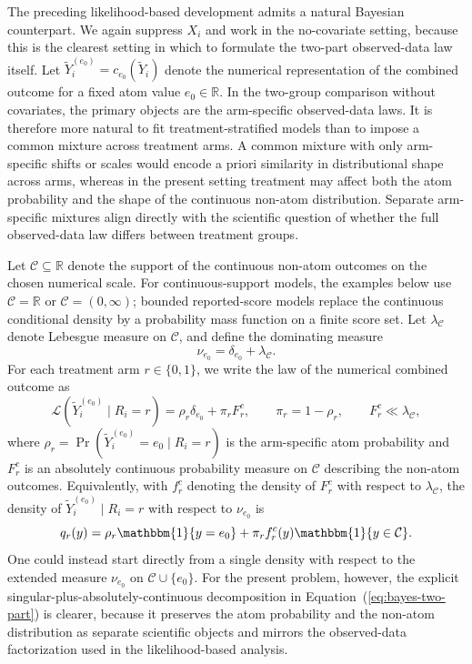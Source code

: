 \documentclass[11pt]{article}
\begin{document}
The preceding likelihood-based development admits a natural Bayesian counterpart. We again suppress $X_i$ and work in the no-covariate setting, because this is the clearest setting in which to formulate the two-part observed-data law itself. Let $\widetilde{Y}_i^{(e_0)} = c_{e_0}(\widetilde{Y}_i)$ denote the numerical representation of the combined outcome for a fixed atom value $e_0 \in \mathbb{R}$. In the two-group comparison without covariates, the primary objects are the arm-specific observed-data laws. It is therefore more natural to fit treatment-stratified models than to impose a common mixture across treatment arms. A common mixture with only arm-specific shifts or scales would encode a priori similarity in distributional shape across arms, whereas in the present setting treatment may affect both the atom probability and the shape of the continuous non-atom distribution. Separate arm-specific mixtures align directly with the scientific question of whether the full observed-data law differs between treatment groups.

Let $\mathcal{C} \subseteq \mathbb{R}$ denote the support of the continuous non-atom outcomes on the chosen numerical scale. For continuous-support models, the examples below use $\mathcal{C} = \mathbb{R}$ or $\mathcal{C} = (0,\infty)$; bounded reported-score models replace the continuous conditional density by a probability mass function on a finite score set. Let $\lambda_{\mathcal{C}}$ denote Lebesgue measure on $\mathcal{C}$, and define the dominating measure
\[
  \nu_{e_0} = \delta_{e_0} + \lambda_{\mathcal{C}}.
\]
For each treatment arm $r \in \{0,1\}$, we write the law of the numerical combined outcome as
\begin{equation}
  \mathcal{L}(\widetilde{Y}_i^{(e_0)} \mid R_i = r)
  = \rho_r \delta_{e_0} + \pi_r F_r^c,
  \qquad
  \pi_r = 1 - \rho_r,
  \qquad
  F_r^c \ll \lambda_{\mathcal{C}},
  \label{eq:bayes-two-part}
\end{equation}
where $\rho_r = \Pr(\widetilde{Y}_i^{(e_0)} = e_0 \mid R_i = r)$ is the arm-specific atom probability and $F_r^c$ is an absolutely continuous probability measure on $\mathcal{C}$ describing the non-atom outcomes. Equivalently, with $f_r^c$ denoting the density of $F_r^c$ with respect to $\lambda_{\mathcal{C}}$, the density of $\widetilde{Y}_i^{(e_0)} \mid R_i = r$ with respect to $\nu_{e_0}$ is
\[
  q_r(y)
  = \rho_r \mathbbm{1}\{y = e_0\}
    + \pi_r f_r^c(y)\mathbbm{1}\{y \in \mathcal{C}\}.
\]
One could instead start directly from a single density with respect to the extended measure $\nu_{e_0}$ on $\mathcal{C} \cup \{e_0\}$. For the present problem, however, the explicit singular-plus-absolutely-continuous decomposition in Equation~(\ref{eq:bayes-two-part}) is clearer, because it preserves the atom probability and the non-atom distribution as separate scientific objects and mirrors the observed-data factorization used in the likelihood-based analysis.
\end{document}
